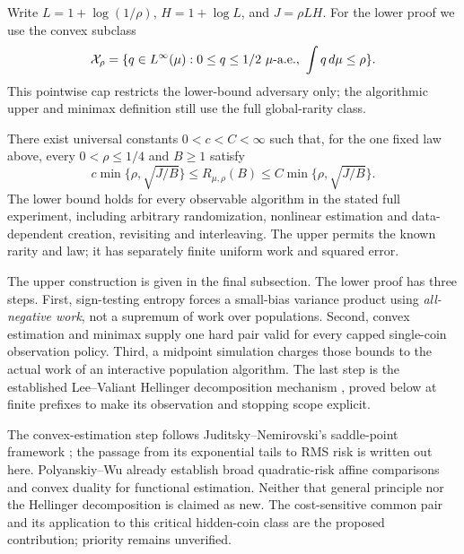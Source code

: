 Write $L=1+\log(1/\rho)$, $H=1+\log L$, and $J=\rho LH$.
For the lower proof we use the convex subclass
\[
 \Xrho=\{q\in L^\infty(\mu):0\le q\le1/2\ \mu\text{-a.e.},\ \int q\,d\mu\le\rho\}.
\]
This pointwise cap restricts the lower-bound adversary only; the algorithmic
upper and minimax definition still use the full global-rarity class.

\begin{theorem}\label{crit:thm:critical-minimax}
There exist universal constants $0<c<C<\infty$ such that, for the one fixed
law above, every $0<\rho\le1/4$ and $B\ge1$ satisfy
\[
 c\min\{\rho,\sqrt{J/B}\}\le R_{\mu,\rho}(B)
       \le C\min\{\rho,\sqrt{J/B}\}.                    \tag{C.A}
\]
The lower bound holds for every observable algorithm in the stated full
experiment, including arbitrary randomization, nonlinear estimation and
data-dependent creation, revisiting and interleaving. The upper permits the
known rarity and law; it has separately finite uniform work and squared error.
\end{theorem}

The upper construction is given in the final subsection. The lower proof has three
steps. First, sign-testing entropy forces a small-bias variance product using
\emph{all-negative work}, not a supremum of work over populations. Second,
convex estimation and minimax supply one hard pair valid for every capped
single-coin observation policy. Third, a midpoint simulation charges those
bounds to the actual work of an interactive population algorithm. The last
step is the established Lee--Valiant Hellinger decomposition mechanism
\cite[Lemma 17]{leevaliant}, proved below at finite prefixes to make its observation
and stopping scope explicit.

The convex-estimation step follows Juditsky--Nemirovski's saddle-point
framework \cite{jn}; the passage from its exponential tails to RMS risk is
written out here. Polyanskiy--Wu \cite{pw} already establish broad quadratic-risk
affine comparisons and convex duality for functional estimation. Neither that
general principle nor the Hellinger decomposition is claimed as new. The
cost-sensitive common pair and its application to this critical hidden-coin
class are the proposed contribution; priority remains unverified.

